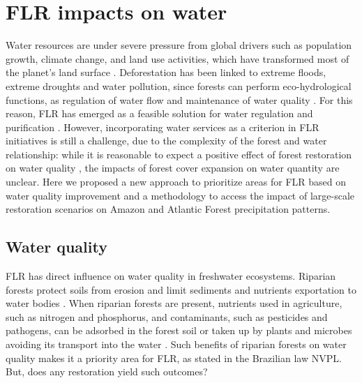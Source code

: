 


\chapter{FLR impacts on water} \label{ch:water}

Water resources are under severe pressure from global drivers such as population growth, climate change, and land use activities, which have transformed most of the planet’s land surface \citep{UNESCO2018}. Deforestation has been linked to extreme floods, extreme droughts and water pollution, since forests can perform eco-hydrological functions, as regulation of water flow and maintenance of water quality \citep{Tambosi2015}. For this reason, FLR has emerged as a feasible solution for water regulation and purification \citep{Banerjee2009}. However, incorporating water services as a criterion in FLR initiatives is still a challenge, due to the complexity of the forest and water relationship: while it is reasonable to expect a positive effect of forest restoration on water quality \citep{Calder2007}, the impacts of forest cover expansion on water quantity are unclear. Here we proposed a new approach to prioritize areas for FLR based on water quality improvement and a methodology to access the impact of large-scale restoration scenarios on Amazon and Atlantic Forest precipitation patterns. 



\section{\Large Water quality } \label{sec:water-qual}

FLR has direct influence on water quality in freshwater ecosystems. Riparian forests protect soils from erosion and limit sediments and nutrients exportation to water bodies \citep{Neary2009}. When riparian forests are present, nutrients used in agriculture, such as nitrogen and phosphorus, and contaminants, such as pesticides and pathogens, can be adsorbed in the forest soil or taken up by plants and microbes avoiding its transport into the water \citep{Gilliam2011}. Such benefits of riparian forests on water quality makes it a priority area for FLR, as stated in the Brazilian law NVPL. But, does any restoration yield such outcomes? 

